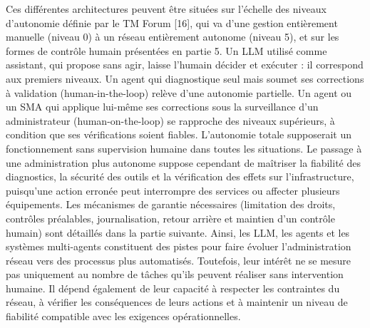 Ces différentes architectures peuvent être situées sur l'échelle des niveaux d'autonomie définie par le TM Forum [16], qui va d'une gestion entièrement manuelle (niveau 0) à un réseau entièrement autonome (niveau 5), et sur les formes de contrôle humain présentées en partie 5. Un LLM utilisé comme assistant, qui propose sans agir, laisse l'humain décider et exécuter : il correspond aux premiers niveaux. Un agent qui diagnostique seul mais soumet ses corrections à validation (human-in-the-loop) relève d'une autonomie partielle. Un agent ou un SMA qui applique lui-même ses corrections sous la surveillance d'un administrateur (human-on-the-loop) se rapproche des niveaux supérieurs, à condition que ses vérifications soient fiables. L'autonomie totale supposerait un fonctionnement sans supervision humaine dans toutes les situations.
Le passage à une administration plus autonome suppose cependant de maîtriser la fiabilité des diagnostics, la sécurité des outils et la vérification des effets sur l'infrastructure, puisqu'une action erronée peut interrompre des services ou affecter plusieurs équipements. Les mécanismes de garantie nécessaires (limitation des droits, contrôles préalables, journalisation, retour arrière et maintien d'un contrôle humain) sont détaillés dans la partie suivante. 
Ainsi, les LLM, les agents et les systèmes multi-agents constituent des pistes pour faire évoluer l'administration réseau vers des processus plus automatisés. Toutefois, leur intérêt ne se mesure pas uniquement au nombre de tâches qu'ils peuvent réaliser sans intervention humaine. Il dépend également de leur capacité à respecter les contraintes du réseau, à vérifier les conséquences de leurs actions et à maintenir un niveau de fiabilité compatible avec les exigences opérationnelles. 

